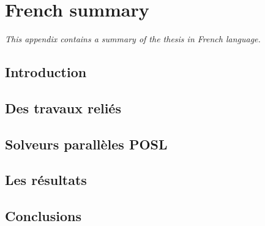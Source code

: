 \chapter{French summary}
\label{app:res_franc}
\textit{This appendix contains a summary of the thesis in French language.}
\vfill
\minitoc
\newpage


\section{Introduction}


\section {Des travaux reli\'es}


\section{Solveurs parallèles POSL}


\section{Les résultats}


\section{Conclusions}
